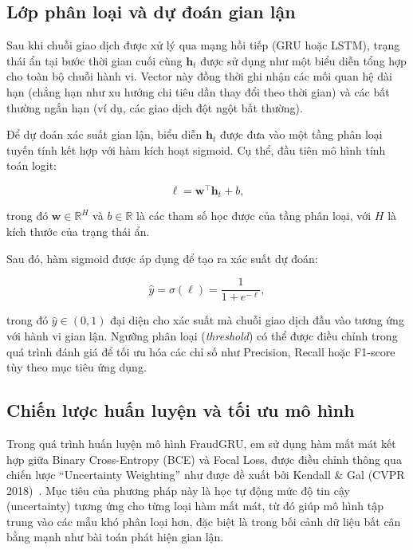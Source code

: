 \subsection{Lớp phân loại và dự đoán gian lận}

Sau khi chuỗi giao dịch được xử lý qua mạng hồi tiếp (GRU hoặc LSTM), trạng thái ẩn tại bước thời gian cuối cùng \( \mathbf{h}_t \) được sử dụng như một biểu diễn tổng hợp cho toàn bộ chuỗi hành vi. Vector này đồng thời ghi nhận các mối quan hệ dài hạn (chẳng hạn như xu hướng chi tiêu dần thay đổi theo thời gian) và các bất thường ngắn hạn (ví dụ, các giao dịch đột ngột bất thường).

Để dự đoán xác suất gian lận, biểu diễn \( \mathbf{h}_t \) được đưa vào một tầng phân loại tuyến tính kết hợp với hàm kích hoạt sigmoid. Cụ thể, đầu tiên mô hình tính toán logit:

\begin{equation}
\ell = \mathbf{w}^\top \mathbf{h}_t + b,
\end{equation}

trong đó \( \mathbf{w} \in \mathbb{R}^H \) và \( b \in \mathbb{R} \) là các tham số học được của tầng phân loại, với \( H \) là kích thước của trạng thái ẩn.

Sau đó, hàm sigmoid được áp dụng để tạo ra xác suất dự đoán:

\begin{equation}
\hat{y} = \sigma(\ell) = \frac{1}{1 + e^{-\ell}},
\end{equation}

trong đó \( \hat{y} \in (0, 1) \) đại diện cho xác suất mà chuỗi giao dịch đầu vào tương ứng với hành vi gian lận. Ngưỡng phân loại (\textit{threshold}) có thể được điều chỉnh trong quá trình đánh giá để tối ưu hóa các chỉ số như Precision, Recall hoặc F1-score tùy theo mục tiêu ứng dụng.


\subsection{Chiến lược huấn luyện và tối ưu mô hình}

Trong quá trình huấn luyện mô hình FraudGRU, em sử dụng hàm mất mát kết hợp giữa Binary Cross-Entropy (BCE) và Focal Loss, được điều chỉnh thông qua chiến lược ``Uncertainty Weighting'' như được đề xuất bởi Kendall \& Gal (CVPR 2018)~\cite{Kendall2018}. Mục tiêu của phương pháp này là học tự động mức độ tin cậy (uncertainty) tương ứng cho từng loại hàm mất mát, từ đó giúp mô hình tập trung vào các mẫu khó phân loại hơn, đặc biệt là trong bối cảnh dữ liệu bất cân bằng mạnh như bài toán phát hiện gian lận.

